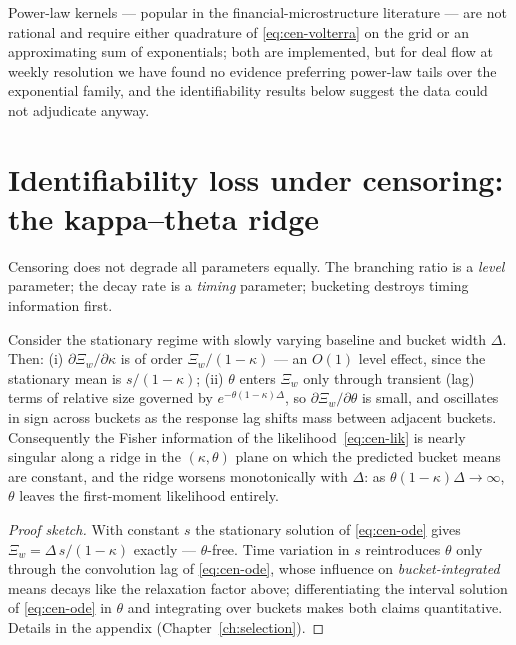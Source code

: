 Power-law kernels --- popular in the financial-microstructure literature --- are not
rational and require either quadrature of \eqref{eq:cen-volterra} on the grid or an
approximating sum of exponentials; both are implemented, but for deal flow at weekly
resolution we have found no evidence preferring power-law tails over the exponential
family, and the identifiability results below suggest the data could not adjudicate
anyway.

\section{Identifiability loss under censoring: the kappa--theta ridge}
\label{sec:cen-ridge}

Censoring does not degrade all parameters equally. The branching ratio is a
\emph{level} parameter; the decay rate is a \emph{timing} parameter; bucketing destroys
timing information first.

\begin{proposition}
\label{prop:cen-ridge}
Consider the stationary regime with slowly varying baseline and bucket width $\Delta$.
Then: (i) $\partial \Xi_w / \partial \kappa$ is of order $\Xi_w/(1-\kappa)$ --- an $O(1)$
level effect, since the stationary mean is $s/(1-\kappa)$; (ii) $\theta$ enters $\Xi_w$
only through transient (lag) terms of relative size governed by
$e^{-\theta(1-\kappa)\Delta}$, so $\partial \Xi_w / \partial \theta$ is small, and
oscillates in sign across buckets as the response lag shifts mass between adjacent
buckets. Consequently the Fisher information of the likelihood~\eqref{eq:cen-lik} is
nearly singular along a ridge in the $(\kappa,\theta)$ plane on which the predicted bucket
means are constant, and the ridge worsens monotonically with $\Delta$: as
$\theta(1-\kappa)\Delta \to \infty$, $\theta$ leaves the first-moment likelihood
entirely.
\end{proposition}

\begin{proof}[Proof sketch]
With constant $s$ the stationary solution of \eqref{eq:cen-ode} gives
$\Xi_w = \Delta\, s/(1-\kappa)$ exactly --- $\theta$-free. Time variation in $s$
reintroduces $\theta$ only through the convolution lag of \eqref{eq:cen-ode}, whose
influence on \emph{bucket-integrated} means decays like the relaxation factor above;
differentiating the interval solution of \eqref{eq:cen-ode} in $\theta$ and integrating
over buckets makes both claims quantitative. Details in the appendix
(Chapter~\ref{ch:selection}).
\end{proof}

